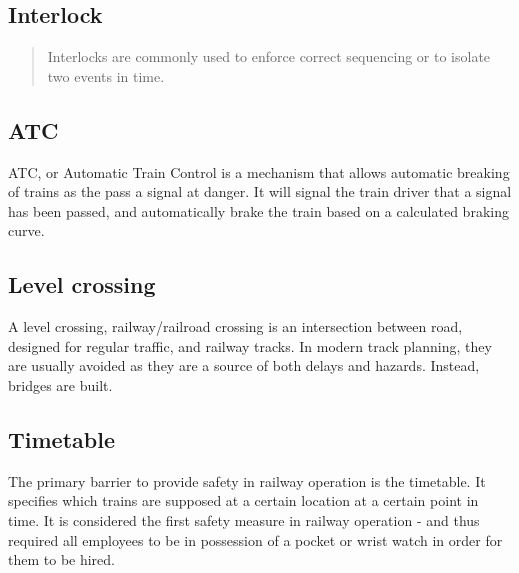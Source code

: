 \subsection{Interlock}

\begin{quote}
Interlocks are commonly used to enforce correct sequencing or to isolate two events in time.
\end{quote}\cite{leveson1995safeware}
\subsection{ATC}
\label{sec:atc}
ATC, or Automatic Train Control is a mechanism that allows automatic breaking of trains as the pass a signal at danger. It will signal the train driver that a signal has been passed, and automatically brake the train based on a calculated braking curve.

\subsection{Level crossing}
A level crossing, railway/railroad crossing is an intersection between road, designed for regular traffic, and railway tracks. In modern track planning, they are usually avoided as they are a source of both delays and hazards. Instead, bridges are built.

\subsection{Timetable}
The primary barrier to provide safety in railway operation is the timetable. It specifies which trains are supposed at a certain location at a certain point in time. It is considered the first safety measure in railway operation - and thus required all employees to be in possession of a pocket or wrist watch in order for them to be hired.




